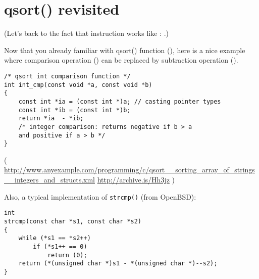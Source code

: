 \section{qsort() revisited}

(Let's back to the fact that  instruction works like : .)

Now that you already familiar with qsort() function (), here is a nice example where
comparison operation () can be replaced by subtraction operation ().

\begin{lstlisting}[style=customc]
/* qsort int comparison function */ 
int int_cmp(const void *a, const void *b) 
{ 
    const int *ia = (const int *)a; // casting pointer types 
    const int *ib = (const int *)b;
    return *ia  - *ib; 
	/* integer comparison: returns negative if b > a 
	and positive if a > b */ 
} 
\end{lstlisting}

( \url{http://www.anyexample.com/programming/c/qsort__sorting_array_of_strings__integers_and_structs.xml} \url{http://archive.is/Hh3jz} )

Also, a typical implementation of \verb|strcmp()| (from OpenBSD):

\begin{lstlisting}[style=customc]
int
strcmp(const char *s1, const char *s2)
{
	while (*s1 == *s2++)
		if (*s1++ == 0)
			return (0);
	return (*(unsigned char *)s1 - *(unsigned char *)--s2);
}
\end{lstlisting}

